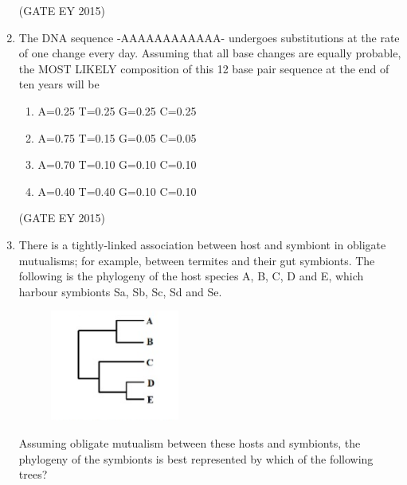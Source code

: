 \documentclass[journal,12pt,onecolumn]{IEEEtran}
\theoremstyle{remark}
\begin{document}
\begin{enumerate}
\begin{enumerate}
    \end{enumerate}
    
\hfill{(GATE EY 2015)}



\item
The DNA sequence -AAAAAAAAAAAA- undergoes substitutions at the rate of one change every day. Assuming that all base changes are equally probable, the MOST LIKELY composition of this 12 base pair sequence at the end of ten years will be
 

\begin{multicols}{2}
\begin{enumerate}
    
\item A=0.25 T=0.25 G=0.25 C=0.25
\item A=0.75 T=0.15 G=0.05 C=0.05 
\item A=0.70 T=0.10 G=0.10 C=0.10
\item A=0.40 T=0.40 G=0.10 C=0.10

    \end{enumerate}
    \end{multicols}
\hfill{(GATE EY 2015)}



\item 
There is a tightly-linked association between host and symbiont in obligate mutualisms; for example, between termites and their gut symbionts. The following is the phylogeny of the host species A, B, C, D and E, which harbour symbionts Sa, Sb, Sc, Sd and Se.
\begin{figure}[H]
    \centering
    \includegraphics[]{figs/Q.61.png}
    \caption{}
    \label{fig:13}
\end{figure}
Assuming obligate mutualism between these hosts and symbionts, the phylogeny of the symbionts is best represented by which of the following trees?


\end{enumerate}
\end{document}
